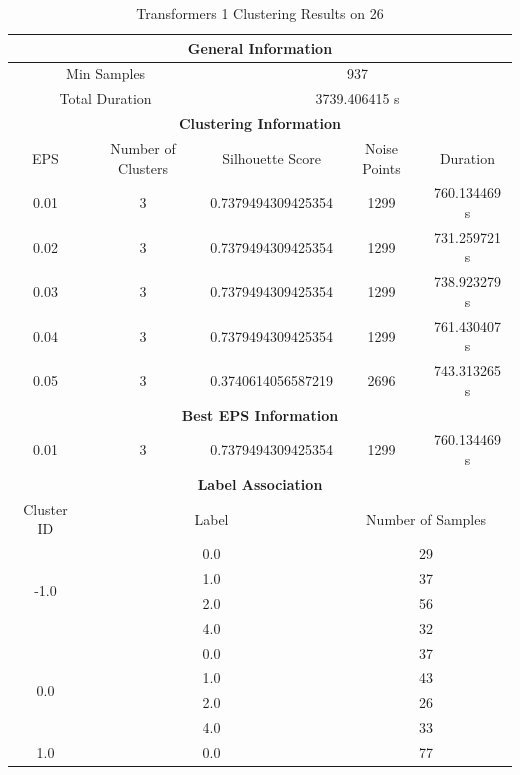 \begin{longtable}{|c|c|c|c|c|}
\caption{Transformers 1 Clustering Results on 26} \label{tab:26_transformers_1_clustering_results}\\
\hline
\multicolumn{5}{|c|}{\textbf{General Information}} \\
\hline
\multicolumn{2}{|c|}{Min Samples} & \multicolumn{3}{c|}{937} \\
\multicolumn{2}{|c|}{Total Duration} & \multicolumn{3}{c|}{3739.406415 s} \\
\hline
\multicolumn{5}{|c|}{\textbf{Clustering Information}} \\
\hline
EPS & Number of Clusters & Silhouette Score & Noise Points & Duration \\
0.01 & 3 & 0.7379494309425354 & 1299 & 760.134469 s\\
0.02 & 3 & 0.7379494309425354 & 1299 & 731.259721 s\\
0.03 & 3 & 0.7379494309425354 & 1299 & 738.923279 s\\
0.04 & 3 & 0.7379494309425354 & 1299 & 761.430407 s\\
0.05 & 3 & 0.3740614056587219 & 2696 & 743.313265 s\\
\hline
\multicolumn{5}{|c|}{\textbf{Best EPS Information}} \\
\hline
0.01 & 3 & 0.7379494309425354 & 1299 & 760.134469 s\\
\hline
\multicolumn{5}{|c|}{\textbf{Label Association}} \\
\hline
Cluster ID & \multicolumn{2}{c|}{Label} & \multicolumn{2}{c|}{Number of Samples} \\
\hline
\multirow{4}{*}{-1.0} & \multicolumn{2}{c|}{0.0} & \multicolumn{2}{c|}{29} \\
& \multicolumn{2}{c|}{1.0} & \multicolumn{2}{c|}{37} \\
& \multicolumn{2}{c|}{2.0} & \multicolumn{2}{c|}{56} \\
& \multicolumn{2}{c|}{4.0} & \multicolumn{2}{c|}{32} \\
\hline
\multirow{4}{*}{0.0} & \multicolumn{2}{c|}{0.0} & \multicolumn{2}{c|}{37} \\
& \multicolumn{2}{c|}{1.0} & \multicolumn{2}{c|}{43} \\
& \multicolumn{2}{c|}{2.0} & \multicolumn{2}{c|}{26} \\
& \multicolumn{2}{c|}{4.0} & \multicolumn{2}{c|}{33} \\
\hline
\multirow{4}{*}{1.0} & \multicolumn{2}{c|}{0.0} & \multicolumn{2}{c|}{77} \\

\end{longtable}
